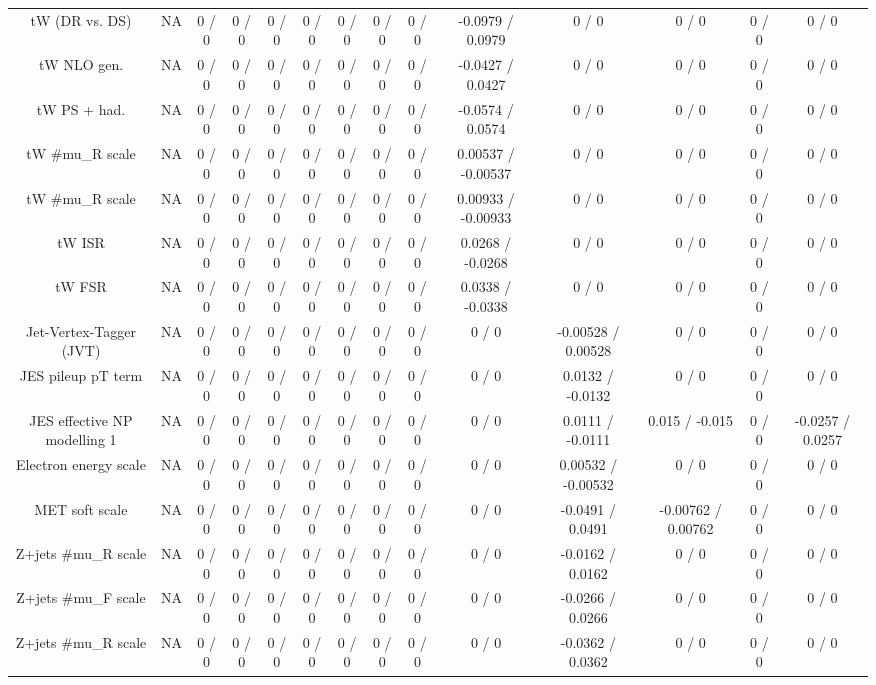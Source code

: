\documentclass[10pt]{article}
\begin{document}
\begin{table}[htbp]
\begin{center}
\begin{tabular}{|c|c|c|c|c|c|c|c|c|c|c|c|c|c|}
  tW (DR vs. DS) &    NA    & 0 / 0 & 0 / 0 & 0 / 0 & 0 / 0 & 0 / 0 & 0 / 0 & 0 / 0 & -0.0979 / 0.0979 & 0 / 0 & 0 / 0 & 0 / 0 & 0 / 0 \\ 
  tW NLO gen. &    NA    & 0 / 0 & 0 / 0 & 0 / 0 & 0 / 0 & 0 / 0 & 0 / 0 & 0 / 0 & -0.0427 / 0.0427 & 0 / 0 & 0 / 0 & 0 / 0 & 0 / 0 \\ 
  tW PS + had. &    NA    & 0 / 0 & 0 / 0 & 0 / 0 & 0 / 0 & 0 / 0 & 0 / 0 & 0 / 0 & -0.0574 / 0.0574 & 0 / 0 & 0 / 0 & 0 / 0 & 0 / 0 \\ 
  tW #mu_{R} scale &    NA    & 0 / 0 & 0 / 0 & 0 / 0 & 0 / 0 & 0 / 0 & 0 / 0 & 0 / 0 & 0.00537 / -0.00537 & 0 / 0 & 0 / 0 & 0 / 0 & 0 / 0 \\ 
  tW #mu_{R} scale &    NA    & 0 / 0 & 0 / 0 & 0 / 0 & 0 / 0 & 0 / 0 & 0 / 0 & 0 / 0 & 0.00933 / -0.00933 & 0 / 0 & 0 / 0 & 0 / 0 & 0 / 0 \\ 
  tW ISR &    NA    & 0 / 0 & 0 / 0 & 0 / 0 & 0 / 0 & 0 / 0 & 0 / 0 & 0 / 0 & 0.0268 / -0.0268 & 0 / 0 & 0 / 0 & 0 / 0 & 0 / 0 \\ 
  tW FSR &    NA    & 0 / 0 & 0 / 0 & 0 / 0 & 0 / 0 & 0 / 0 & 0 / 0 & 0 / 0 & 0.0338 / -0.0338 & 0 / 0 & 0 / 0 & 0 / 0 & 0 / 0 \\ 
  Jet-Vertex-Tagger (JVT) &    NA    & 0 / 0 & 0 / 0 & 0 / 0 & 0 / 0 & 0 / 0 & 0 / 0 & 0 / 0 & 0 / 0 & -0.00528 / 0.00528 & 0 / 0 & 0 / 0 & 0 / 0 \\ 
  JES pileup pT term &    NA    & 0 / 0 & 0 / 0 & 0 / 0 & 0 / 0 & 0 / 0 & 0 / 0 & 0 / 0 & 0 / 0 & 0.0132 / -0.0132 & 0 / 0 & 0 / 0 & 0 / 0 \\ 
  JES effective NP modelling 1 &    NA    & 0 / 0 & 0 / 0 & 0 / 0 & 0 / 0 & 0 / 0 & 0 / 0 & 0 / 0 & 0 / 0 & 0.0111 / -0.0111 & 0.015 / -0.015 & 0 / 0 & -0.0257 / 0.0257 \\ 
  Electron energy scale &    NA    & 0 / 0 & 0 / 0 & 0 / 0 & 0 / 0 & 0 / 0 & 0 / 0 & 0 / 0 & 0 / 0 & 0.00532 / -0.00532 & 0 / 0 & 0 / 0 & 0 / 0 \\ 
  MET soft scale &    NA    & 0 / 0 & 0 / 0 & 0 / 0 & 0 / 0 & 0 / 0 & 0 / 0 & 0 / 0 & 0 / 0 & -0.0491 / 0.0491 & -0.00762 / 0.00762 & 0 / 0 & 0 / 0 \\ 
  Z+jets #mu_{R} scale &    NA    & 0 / 0 & 0 / 0 & 0 / 0 & 0 / 0 & 0 / 0 & 0 / 0 & 0 / 0 & 0 / 0 & -0.0162 / 0.0162 & 0 / 0 & 0 / 0 & 0 / 0 \\ 
  Z+jets #mu_{F} scale &    NA    & 0 / 0 & 0 / 0 & 0 / 0 & 0 / 0 & 0 / 0 & 0 / 0 & 0 / 0 & 0 / 0 & -0.0266 / 0.0266 & 0 / 0 & 0 / 0 & 0 / 0 \\ 
  Z+jets #mu_{R} scale &    NA    & 0 / 0 & 0 / 0 & 0 / 0 & 0 / 0 & 0 / 0 & 0 / 0 & 0 / 0 & 0 / 0 & -0.0362 / 0.0362 & 0 / 0 & 0 / 0 & 0 / 0 \\ 

\end{tabular}
\end{center}
\end{table}
\end{document}
